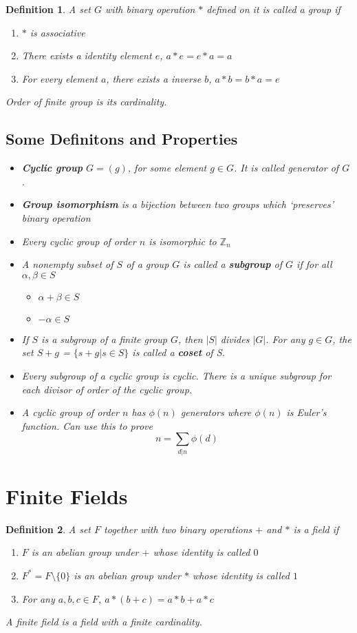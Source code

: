 \documentclass[a4paper]{article}
\theoremstyle{dotless}
\theoremstyle{dotless}
\newtheorem{defn}{Definition}[section]
\theoremstyle{remark}
\begin{document}
\begin{defn} 
A set $G$ with binary operation $*$ defined on it is called a group if
\begin{enumerate}
\item $*$ is associative
\item There exists a identity element $e$, $a*e = e*a = a$
\item For every element $a$, there exists a inverse $b$, $a*b = b*a = e$
\end{enumerate}
Order of finite group is its cardinality.
\subsection{Some Definitons and Properties}
\begin{itemize}
\item \textbf{Cyclic group} $G = (g)$, for some element $g \in G$. It is called generator of $G$.
\item \textbf{Group isomorphism} is a bijection between two groups which `preserves' binary operation
\item Every cyclic group of order $n$ is isomorphic to $\mathbb{Z}_n$
\item A nonempty subset of $S$ of a group $G$ is called a \textbf{subgroup} of $G$ if for all $\alpha, \beta \in S$
		\begin{itemize}
		\item $\alpha + \beta \in S$
		\item $-\alpha \in S$
		\end{itemize}

\item If $S$ is a subgroup of a finite group $G$, then $|S|$ divides $|G|$. For any $g \in G$, the set $S+g$ = $\{s + g|s \in S\}$ is called a \textbf{coset} of S.
\item Every subgroup of a cyclic group is cyclic. There is a \emph{unique} subgroup for each divisor of order of the cyclic group.
\item A cyclic group of order $n$ has $\phi(n)$ generators where $\phi(n)$ is Euler's function. Can use this to prove
$$n = \sum_{d|n}\phi(d)$$
\end{itemize}
\end{defn}


\section{Finite Fields}
\begin{defn}
A set $F$ together with two binary operations $+$ and $*$ is a field if
\begin{enumerate}
\item $F$ is an abelian group under $+$ whose identity is called $0$
\item $F^* = F \setminus \{0\} $ is an abelian group under $*$ whose identity is called $1$
\item For any $a,b,c \in F$, $a * (b + c) = a * b + a * c$
\end{enumerate}
A finite field is a field with a finite cardinality.
\end{defn}
\end{document}
